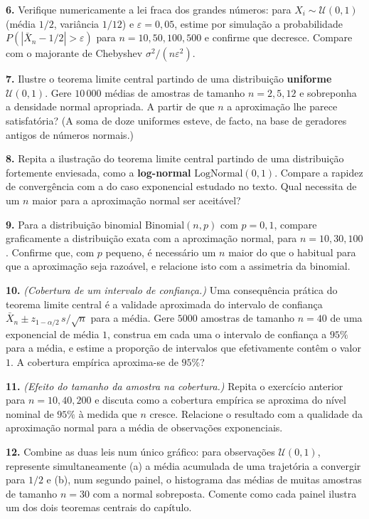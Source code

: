 \documentclass[
  portuguese,
  11pt,
  openany]{book}
\begin{document}
\textbf{6.} Verifique numericamente a lei fraca dos grandes números: para
\(X_i \sim \mathcal{U}(0,1)\) (média \(1/2\), variância \(1/12\)) e \(\varepsilon = 0{,}05\),
estime por simulação a probabilidade \(P(|\bar{X}_n - 1/2| > \varepsilon)\) para
\(n = 10, 50, 100, 500\) e confirme que decresce. Compare com o majorante de
Chebyshev \(\sigma^2/(n\varepsilon^2)\).

\textbf{7.} Ilustre o teorema limite central partindo de uma distribuição
\textbf{uniforme} \(\mathcal{U}(0,1)\). Gere \(10\,000\) médias de amostras de tamanho
\(n = 2, 5, 12\) e sobreponha a densidade normal apropriada. A partir de que \(n\) a
aproximação lhe parece satisfatória? (A soma de doze uniformes esteve, de facto,
na base de geradores antigos de números normais.)

\textbf{8.} Repita a ilustração do teorema limite central partindo de uma
distribuição fortemente enviesada, como a \textbf{log-normal} \(\text{LogNormal}(0, 1)\).
Compare a rapidez de convergência com a do caso exponencial estudado no texto.
Qual necessita de um \(n\) maior para a aproximação normal ser aceitável?

\textbf{9.} Para a distribuição binomial \(\text{Binomial}(n, p)\) com \(p = 0{,}1\),
compare graficamente a distribuição exata com a aproximação normal, para
\(n = 10, 30, 100\). Confirme que, com \(p\) pequeno, é necessário um \(n\) maior do
que o habitual para que a aproximação seja razoável, e relacione isto com a
assimetria da binomial.

\textbf{10.} \emph{(Cobertura de um intervalo de confiança.)} Uma consequência prática do
teorema limite central é a validade aproximada do intervalo de confiança
\(\bar{X}_n \pm z_{1-\alpha/2}\,s/\sqrt{n}\) para a média. Gere \(5000\) amostras de
tamanho \(n = 40\) de uma exponencial de média \(1\), construa em cada uma o
intervalo de confiança a \(95\%\) para a média, e estime a proporção de intervalos
que efetivamente contêm o valor \(1\). A cobertura empírica aproxima-se de \(95\%\)?

\textbf{11.} \emph{(Efeito do tamanho da amostra na cobertura.)} Repita o exercício
anterior para \(n = 10, 40, 200\) e discuta como a cobertura empírica se aproxima
do nível nominal de \(95\%\) à medida que \(n\) cresce. Relacione o resultado com a
qualidade da aproximação normal para a média de observações exponenciais.

\textbf{12.} Combine as duas leis num único gráfico: para observações
\(\mathcal{U}(0,1)\), represente simultaneamente (a) a média acumulada de uma
trajetória a convergir para \(1/2\) e (b), num segundo painel, o histograma das
médias de muitas amostras de tamanho \(n = 30\) com a normal sobreposta. Comente
como cada painel ilustra um dos dois teoremas centrais do capítulo.
\end{document}
